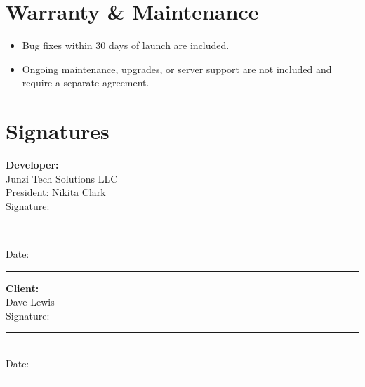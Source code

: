 \documentclass[11pt,letterpaper]{article}
\newcommand{\ClientName}{Dave Lewis}
\begin{document}
\section{Warranty \& Maintenance}
\begin{itemize}[leftmargin=*]
\item Bug fixes within 30 days of launch are included.
\item Ongoing maintenance, upgrades, or server support are not included and require a separate agreement.
\end{itemize}

\vspace{2em}

\section*{Signatures}

\begin{minipage}{0.45\textwidth}
\textbf{Developer:}\\
Junzi Tech Solutions LLC\\
President: Nikita Clark\\[2em]
Signature: \rule{6cm}{0.4pt}\\[0.5em]
Date: \rule{4cm}{0.4pt}
\end{minipage}
\hfill
\begin{minipage}{0.45\textwidth}
\textbf{Client:}\\
\ClientName{}\\[3em]
Signature: \rule{6cm}{0.4pt}\\[0.5em]
Date: \rule{4cm}{0.4pt}
\end{minipage}
\end{document}
